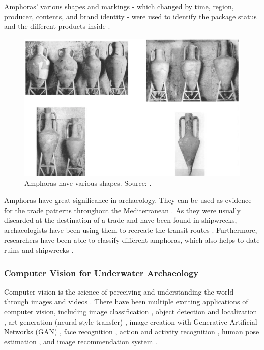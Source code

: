 \documentclass[a4paper,11pt,oneside]{article}
\begin{document}
  Amphoras' various shapes and markings - which changed by time, region, producer, contents, and brand
  identity - were used to identify the package status and the different products inside \cite{twede2002commercial}.

  \begin{figure}[ht]
    \begin{center}
      \includegraphics[width=.8\textwidth]{amphora_various_shape.png}
    \end{center}
    \caption{Amphoras have various shapes. Source: \cite{twede2002commercial}.}
  \end{figure}

  Amphoras have great significance in archaeology. They can be used as evidence for the trade patterns throughout
  the Mediterranean \cite{twede2002commercial}. As they were usually discarded at the destination of a trade and have been
  found in shipwrecks, archaeologists have been using them to recreate the transit routes \cite{twede2002commercial}.
  Furthermore, researchers have been able to classify different amphoras, which also helps to date ruins and shipwrecks
  \cite{twede2002commercial}.

  \subsubsection{Computer Vision for Underwater Archaeology}

  Computer vision is the science of perceiving and understanding the world through images and videos \cite{elgendy2020deep}.
  There have been multiple exciting applications of computer vision, including image classification \cite{rawat2017deep},
  object detection and localization \cite{zhao2019object,liu2020deep}, art generation (neural style transfer)
  \cite{jing2019neural}, image creation with Generative Artificial Networks (GAN) \cite{goodfellow2014generative},
  face recognition \cite{parkhi2015deep}, action and activity recognition \cite{poppe2010survey}, human pose estimation
  \cite{toshev2014deeppose}, and image recommendation system \cite{niu2018neural}.
\end{document}

